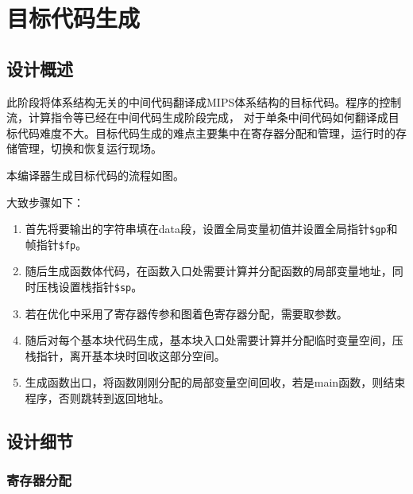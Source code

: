 \chapter{目标代码生成}
\section{设计概述}

此阶段将体系结构无关的中间代码翻译成MIPS体系结构的目标代码。程序的控制流，计算指令等已经在中间代码生成阶段完成，
对于单条中间代码如何翻译成目标代码难度不大。目标代码生成的难点主要集中在寄存器分配和管理，运行时的存储管理，切换和恢复运行现场。

本编译器生成目标代码的流程如图。\todo

大致步骤如下：
\begin{enumerate}
    \item 首先将要输出的字符串填在data段，设置全局变量初值并设置全局指针\texttt{\$gp}和帧指针\texttt{\$fp}。
    \item 随后生成函数体代码，在函数入口处需要计算并分配函数的局部变量地址，同时压栈设置栈指针\texttt{\$sp}。
    \item 若在优化中采用了寄存器传参和图着色寄存器分配，需要取参数。
    \item 随后对每个基本块代码生成，基本块入口处需要计算并分配临时变量空间，压栈指针，离开基本块时回收这部分空间。
    \item 生成函数出口，将函数刚刚分配的局部变量空间回收，若是main函数，则结束程序，否则跳转到返回地址。
\end{enumerate}

\section{设计细节}

\subsection{寄存器分配}

